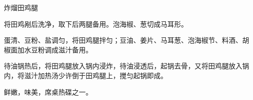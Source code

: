 \begin{recipe}{炸熘田鸡腿}

\ingredients


\preparation

\step 将田鸡剐后洗净，取下后两腿备用。泡海椒、葱切成马耳形。

\step 蛋清、豆粉、盐调匀，将田鸡腿拌匀；豆油、姜片、马耳葱、泡海椒节、料酒、胡
椒面加水豆粉调成滋汁备用。

\step 待油锅热后，将田鸡腿放入锅内浸炸，待油浸透后，起锅去骨，又将田鸡腿放入锅
内，将滋汁加热汤少许倒于田鸡腿上，搅匀起锅即成。

\features

鲜嫩，味美，席桌热碟之一。

\end{recipe}

